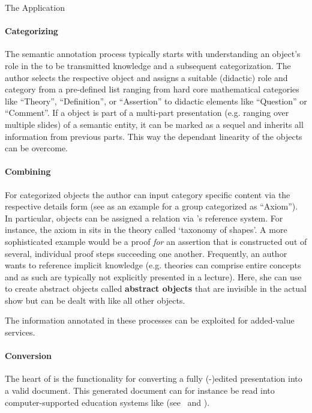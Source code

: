 \begin{omgroup}[id=cpoint,short=\cpoint,creators=ako]
\begin{omgroup}[id=cpoint.app]{The {\cpoint} Application}
\paragraph{Categorizing}\label{sec:annotationform}
The semantic annotation process typically starts with understanding an object's role in
the to be transmitted knowledge and a subsequent categorization. The author selects the
respective {\ppt} object and assigns a suitable (didactic) role and category from a
pre-defined list ranging from hard core mathematical categories like ``Theory'',
``Definition'', or ``Assertion'' to didactic elements like ``Question'' or ``Comment''. If a {\ppt} object is part of a
multi-part presentation (e.g. ranging over multiple slides) of a semantic entity, it can
be marked as a sequel and inherits all information from previous parts. This way the
{\ppt} dependant linearity of the objects can be overcome.

\paragraph{Combining}\label{sec:detailsform}
For categorized {\ppt} objects the author can input category specific content via the
respective details form (see {} as an example for a {\ppt} group
categorized as ``Axiom''). In particular, {\ppt} objects can be assigned a relation via
{\cpoint}'s reference system. For instance, the axiom in {} sits in the
theory called `taxonomy of shapes'. A more sophisticated example would be a proof
{\emph{for}} an assertion that is constructed out of several, individual proof steps
succeeding one another.  Frequently, an author wants to reference implicit knowledge (e.g.
theories can comprise entire concepts and as such are typically not explicitly presented
in a lecture). Here, she can use {\cpoint} to create abstract {\ppt} objects called {\bf
  abstract objects} that are invisible in the actual {\ppt} show but can be dealt with like all other {\ppt} objects.

\begin{myfig}{Content}{The {\cpoint} Content Form for an Axiom Object}
  \texttt{[image: \\projectsPath\{cpoint/CPointContent]}}
\end{myfig}
The information annotated in these processes can be exploited for added-value services.

\paragraph{{\omdoc} Conversion}\label{sec:omdocize} The heart of {\cpoint} is the
functionality for converting a fully ({\cpoint}-)edited presentation into a valid {\omdoc}
document.  This generated {\omdoc} document can for instance be read into
computer-supported education systems like {\activemath} (see~\cite{activemathAIEDJ01} and
{}).


\end{omgroup}
\end{omgroup}
